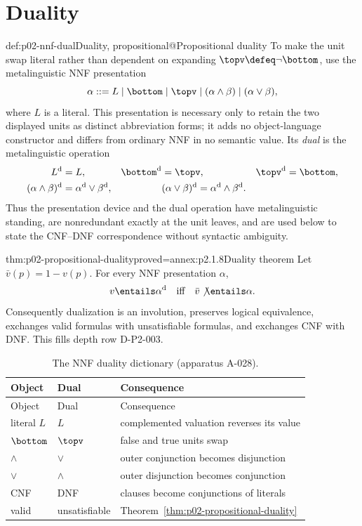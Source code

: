\section{Duality}
\label{sec:p02-propositional-duality}

\begin{hbdefinition}{def:p02-nnf-dual}{Duality, propositional@Propositional duality}
To make the unit swap literal rather than dependent on expanding
\(\topv\defeq\neg\bottom\), use the metalinguistic NNF presentation
\[
 \alpha ::= L\mid\bottom\mid\topv\mid(\alpha\land\beta)
             \mid(\alpha\lor\beta),
\]
where \(L\) is a literal.  This presentation is necessary only to retain the
two displayed units as distinct abbreviation forms; it adds no object-language
constructor and differs from ordinary NNF in no semantic value.  Its
\emph{dual} is the metalinguistic operation
\[
\begin{aligned}
 L^{\mathrm d}&=L,&
 \bottom^{\mathrm d}&=\topv,&
 \topv^{\mathrm d}&=\bottom,\\
 (\alpha\land\beta)^{\mathrm d}
   &=\alpha^{\mathrm d}\lor\beta^{\mathrm d},&&
 (\alpha\lor\beta)^{\mathrm d}
   =\alpha^{\mathrm d}\land\beta^{\mathrm d}.
\end{aligned}
\]
Thus the presentation device and the dual operation have metalinguistic
standing, are nonredundant exactly at the unit leaves, and are used below to
state the CNF--DNF correspondence without syntactic ambiguity.
\end{hbdefinition}

\begin{hbtheorem}{thm:p02-propositional-duality}{proved=annex:p2.1.8}{Duality theorem}
Let \(\bar v(p)=1-v(p)\).  For every NNF
presentation \(\alpha\),
\[
 v\entails\alpha^{\mathrm d}\quad\text{iff}\quad
 \bar v\not\entails\alpha.
\]
Consequently dualization is an involution, preserves logical equivalence,
exchanges valid formulas with unsatisfiable formulas, and exchanges CNF with
DNF.  This fills depth row D-P2-003.
\end{hbtheorem}

\begingroup\small
\begin{longtable}{@{}lll@{}}
\caption{The NNF duality dictionary (apparatus A-028).}
\label{tab:p02-duality}\\
\toprule Object & Dual & Consequence \\
\midrule\endfirsthead
\toprule Object & Dual & Consequence \\
\midrule\endhead
literal \(L\) & \(L\) & complemented valuation reverses its value \\
\(\bottom\) & \(\topv\) & false and true units swap \\
\(\land\) & \(\lor\) & outer conjunction becomes disjunction \\
\(\lor\) & \(\land\) & outer disjunction becomes conjunction \\
CNF & DNF & clauses become conjunctions of literals \\
valid & unsatisfiable & Theorem~\ref{thm:p02-propositional-duality} \\
\bottomrule
\end{longtable}
\endgroup

